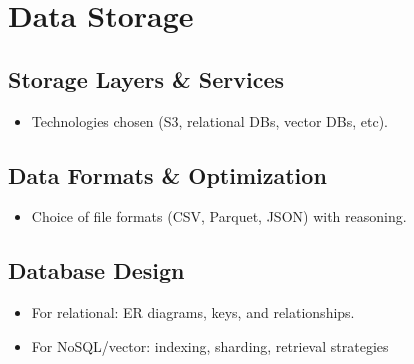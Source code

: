 \cleardoublepage%
\chapter{\label{chap:ds}Data Storage}%
\section{\label{sec:ds_dssl}Storage Layers \& Services}

\begin{itemize}
    \item Technologies chosen (S3, relational DBs, vector DBs, etc).
\end{itemize}



\section{\label{sec:ds_rd}Data Formats \& Optimization}

\begin{itemize}
    \item Choice of file formats (CSV, Parquet, JSON) with reasoning.
\end{itemize}



\section{\label{sec:ds_nsq}Database Design} 


\begin{itemize}
\item For relational: ER diagrams, keys, and relationships.
\item For NoSQL/vector: indexing, sharding, retrieval strategies
\end{itemize}


